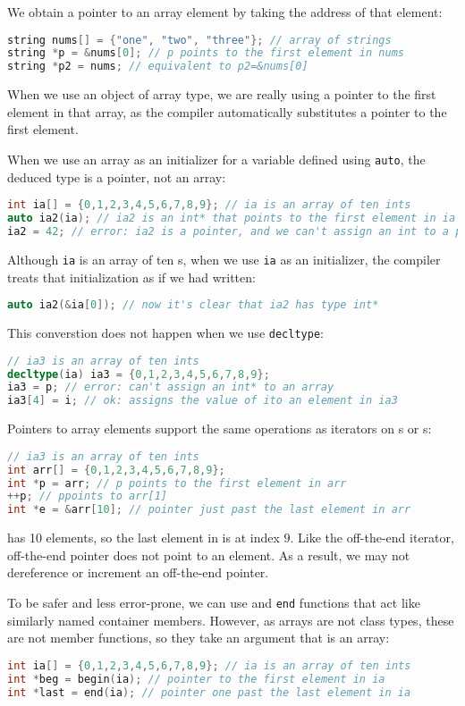 We obtain a pointer to an array element by taking the address of that element:
\begin{lstlisting}[language=C++]
string nums[] = {"one", "two", "three"}; // array of strings 
string *p = &nums[0]; // p points to the first element in nums
string *p2 = nums; // equivalent to p2=&nums[0]
\end{lstlisting}
When we use an object of array type, we are really using a pointer to the first element in that array, as the compiler automatically substitutes a pointer to the first element.

When we use an array as an initializer for a variable defined using \texttt{auto}, the deduced type is a pointer, not an array:
\begin{lstlisting}[language=C++]
int ia[] = {0,1,2,3,4,5,6,7,8,9}; // ia is an array of ten ints 
auto ia2(ia); // ia2 is an int* that points to the first element in ia 
ia2 = 42; // error: ia2 is a pointer, and we can't assign an int to a pointer
\end{lstlisting}
Although \texttt{ia} is an array of ten s, when we use \texttt{ia} as an initializer, the compiler treats that initialization as if we had written:
\begin{lstlisting}[language=C++]
auto ia2(&ia[0]); // now it's clear that ia2 has type int*
\end{lstlisting}
This converstion does not happen when we use \texttt{decltype}:
\begin{lstlisting}[language=C++]
// ia3 is an array of ten ints 
decltype(ia) ia3 = {0,1,2,3,4,5,6,7,8,9}; 
ia3 = p; // error: can't assign an int* to an array 
ia3[4] = i; // ok: assigns the value of ito an element in ia3
\end{lstlisting}

Pointers to array elements support the same operations as iterators on s or s:
\begin{lstlisting}[language=C++]
// ia3 is an array of ten ints 
int arr[] = {0,1,2,3,4,5,6,7,8,9}; 
int *p = arr; // p points to the first element in arr 
++p; // ppoints to arr[1]
int *e = &arr[10]; // pointer just past the last element in arr
\end{lstlisting}
 has 10 elements, so the last element in  is at index $9$. Like the off-the-end iterator, off-the-end pointer does not point to an element. As a result, we may not dereference or increment an off-the-end pointer.

To be safer and less error-prone, we can use  and \texttt{end} functions that act like similarly named container members. However, as arrays are not class types, these are not member functions, so they take an argument that is an array:
\begin{lstlisting}[language=C++]
int ia[] = {0,1,2,3,4,5,6,7,8,9}; // ia is an array of ten ints 
int *beg = begin(ia); // pointer to the first element in ia 
int *last = end(ia); // pointer one past the last element in ia
\end{lstlisting}

